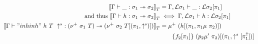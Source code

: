 \begin{align*}
  {{\llbracket {{ {\Gamma} \vdash {\_} : {\sigma_1} \twoheadrightarrow {\sigma_2}}} \rrbracket}_T} &= { {\Gamma, {\mathcal{L}}\sigma_1} \vdash {\_} : {{\mathcal{L}}\sigma_2[\pi_1]} } \\ \text{ and thus } {{\llbracket {{ {\Gamma} \vdash {h} : {\sigma_1} \twoheadrightarrow {\sigma_2}}} \rrbracket}_T} &\iff  { {\Gamma, {\mathcal{L}}\sigma_1} \vdash {h} : {{\mathcal{L}}\sigma_2[\pi_1]} } \\
  {{\llbracket {{ {\Gamma} \vdash {"inhinh"~h~T~\uparrow^s} : {(\nu^+ \  \sigma_1 \  T)} \twoheadrightarrow {(\nu^+ \  \sigma_2 \  T[(\pi_1, \uparrow^s)])}}} \rrbracket}_T} &= \mu^+~(h[(\pi_1,\pi_1\mu~\pi_2)])\\ &\quad \quad \{f_2[\pi_1]\}~(p_2\mu'~\pi_2)[(\pi_1, \uparrow^s[\pi_1^{\uparrow}])] \\
\end{align*}



